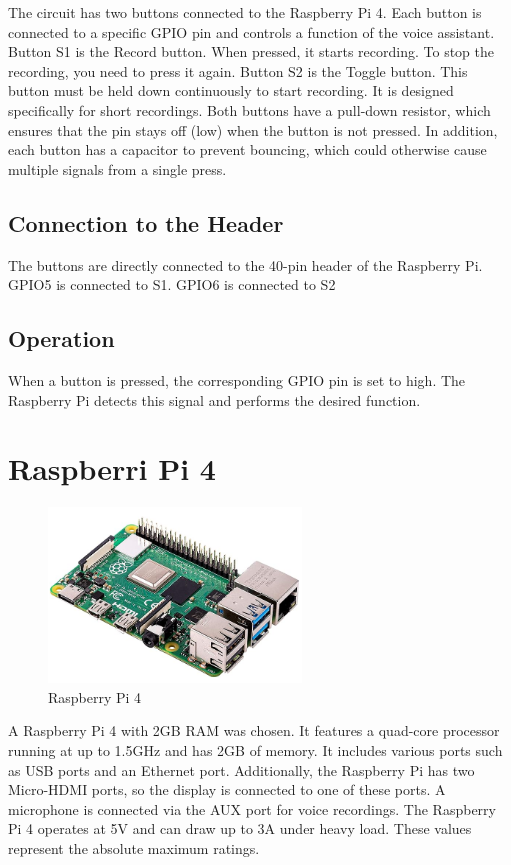 The circuit has two buttons connected to the Raspberry Pi 4. Each button is connected to a specific GPIO pin and controls a function of the voice assistant.
Button S1 is the Record button. When pressed, it starts recording. To stop the recording, you need to press it again.
Button S2 is the Toggle button. This button must be held down continuously to start recording. It is designed specifically for short recordings.
Both buttons have a pull-down resistor, which ensures that the pin stays off (low) when the button is not pressed. In addition, each button has a capacitor to prevent bouncing, which could otherwise cause multiple signals from a single press.

\subsection*{Connection to the Header}
The buttons are directly connected to the 40-pin header of the Raspberry Pi. GPIO5 is connected to S1. GPIO6 is connected to S2

\subsection*{Operation}
When a button is pressed, the corresponding GPIO pin is set to high. The Raspberry Pi detects this signal and performs the desired function.

\newpage

\section{Raspberri Pi 4}

\begin{figure}[h]
\centering
\includegraphics[width=0.6\textwidth]{assets/Raspi.png}
\caption{Raspberry Pi 4}
\label{fig:Raspberry Pi 4}
\end{figure}

A Raspberry Pi 4 with 2GB RAM was chosen. It features a quad-core processor running at up to 1.5GHz and has 2GB of memory. It includes various ports such as USB ports and an Ethernet port. Additionally, the Raspberry Pi has two Micro-HDMI ports, so the display is connected to one of these ports. A microphone is connected via the AUX port for voice recordings. The Raspberry Pi 4 operates at 5V and can draw up to 3A under heavy load. These values represent the absolute maximum ratings.

